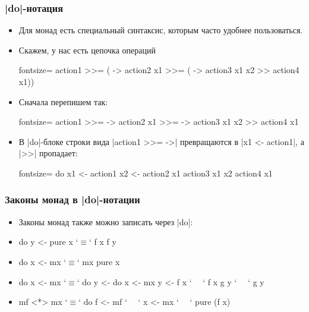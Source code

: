 \documentclass[11pt]{beamer}
\begin{document}
\begin{frame}[fragile]
\frametitle{\haskinline|do|-нотация}
\begin{itemize}
    \item Для монад есть специальный синтаксис, которым часто удобнее пользоваться.
    \item Скажем, у нас есть цепочка операций
    \begin{haskell*}{fontsize=\footnotesize}
    action1 >>= ( -> action2 x1 >>= 
      ( -> action3 x1 x2 >> action4 x1))
    \end{haskell*} 
    \item
    Сначала перепишем так:
    \begin{haskell*}{fontsize=\footnotesize}
    action1 >>=  -> 
      action2 x1 >>=  -> 
        action3 x1 x2 >>
          action4 x1
    \end{haskell*}
    \item
    В \haskinline|do|-блоке строки вида \haskinline|action1 >>=  ->| превращаются в \haskinline|x1 <- action1|, а \haskinline|>>| пропадает:
    \begin{haskell*}{fontsize=\footnotesize}
    do x1 <- action1
       x2 <- action2 x1
       action3 x1 x2
       action4 x1
    \end{haskell*}
\end{itemize}
\end{frame}

\begin{frame}[fragile]
\frametitle{Законы монад в \haskinline|do|-нотации}
\begin{itemize}[<+->]
    \item Законы монад также можно записать через \haskinline|do|:
    \item 
    \begin{haskell}
    do y <- pure x    `$\mathtt{\equiv}$`    f x
       f y
    \end{haskell} 
    \item 
    \begin{haskell}
    do x <- mx        `$\mathtt{\equiv}$`    mx
       pure x
    \end{haskell}
    \item 
    \begin{haskell}
    do x <- mx        `$\mathtt{\equiv}$`    do y <- do x <- mx
       y <- f x       `\textcolor{white}{$\mathtt{\equiv}$}`               f x
       g y            `\textcolor{white}{$\mathtt{\equiv}$}`       g y
    \end{haskell}
    \item 
    \begin{haskell}
    mf <*> mx         `$\mathtt{\equiv}$`    do f <- mf
                      `\textcolor{white}{$\mathtt{\equiv}$}`       x <- mx
                      `\textcolor{white}{$\mathtt{\equiv}$}`       pure (f x)
    \end{haskell}
\end{itemize}
\end{frame}
\end{document}
